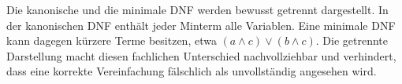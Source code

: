 
Die kanonische und die minimale DNF werden bewusst getrennt dargestellt. In der
kanonischen DNF enthält jeder Minterm alle Variablen. Eine minimale DNF kann dagegen
kürzere Terme besitzen, etwa \((a \land c) \lor (b \land c)\). Die getrennte Darstellung
macht diesen fachlichen Unterschied nachvollziehbar und verhindert, dass eine korrekte
Vereinfachung fälschlich als unvollständig angesehen wird.
